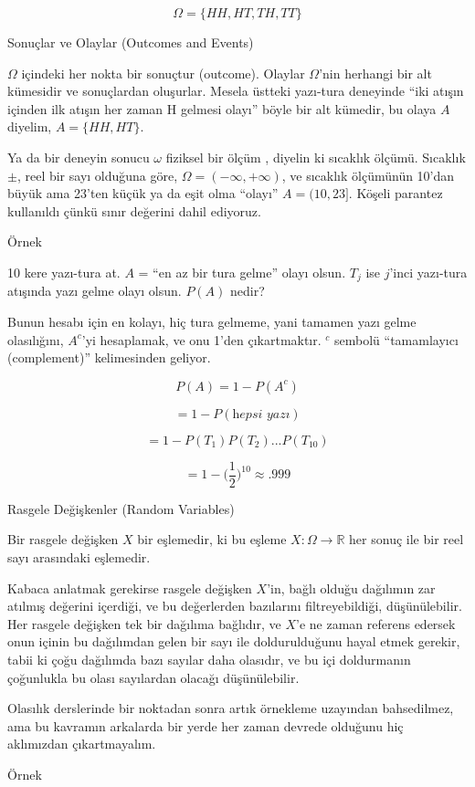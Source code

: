 \documentclass[12pt,fleqn]{article}\usepackage{../../common}
\begin{document}
$$\Omega = \{HH,HT,TH,TT\} $$

Sonuçlar ve Olaylar (Outcomes and Events)

$\Omega$ içindeki her nokta bir sonuçtur (outcome). Olaylar $\Omega$'nin
herhangi bir alt kümesidir ve sonuçlardan oluşurlar. Mesela üstteki
yazı-tura deneyinde ``iki atışın içinden ilk atışın her zaman H gelmesi
olayı'' böyle bir alt kümedir, bu olaya $A$ diyelim, $A =
\{HH,HT\}$.

Ya da bir deneyin sonucu $\omega$ fiziksel bir ölçüm , diyelin ki sıcaklık
ölçümü. Sıcaklık $\pm$, reel bir sayı olduğuna göre, $\Omega = (-\infty,
+\infty)$, ve sıcaklık ölçümünün 10'dan büyük ama 23'ten küçük ya da eşit
olma ``olayı'' $A = (10,23]$. Köşeli parantez kullanıldı çünkü sınır
değerini dahil ediyoruz. 

Örnek 

10 kere yazı-tura at. $A$ = ``en az bir tura gelme'' olayı olsun. $T_j$ ise
$j$'inci yazı-tura atışında yazı gelme olayı olsun. $P(A)$ nedir? 

Bunun hesabı için en kolayı, hiç tura gelmeme, yani tamamen yazı gelme
olasılığını, $A^c$'yi hesaplamak, ve onu 1'den çıkartmaktır. $^c$ sembolü
``tamamlayıcı (complement)'' kelimesinden geliyor.

$$ P(A) = 1 - P(A^c) $$

$$ = 1 - P(\textit{hepsi yazı}) $$

$$ = 1-P(T_1)P(T_2)...P(T_{10}) $$

$$ = 1 - \bigg(\frac{1}{2}\bigg)^{10} \approx .999 $$

Rasgele Değişkenler (Random Variables)

Bir rasgele değişken $X$ bir eşlemedir, ki bu eşleme $X: \Omega \to
\mathbb{R}$ her sonuç ile bir reel sayı arasındaki eşlemedir.

Kabaca anlatmak gerekirse rasgele değişken $X$'in, bağlı olduğu dağılımın
zar atılmış değerini içerdiği, ve bu değerlerden bazılarını
filtreyebildiği, düşünülebilir. Her rasgele değişken tek bir dağılıma
bağlıdır, ve $X$'e ne zaman referens edersek onun içinin bu dağılımdan
gelen bir sayı ile doldurulduğunu hayal etmek gerekir, tabii ki çoğu
dağılımda bazı sayılar daha olasıdır, ve bu içi doldurmanın çoğunlukla bu
olası sayılardan olacağı düşünülebilir.

Olasılık derslerinde bir noktadan sonra artık örnekleme uzayından
bahsedilmez, ama bu kavramın arkalarda bir yerde her zaman devrede olduğunu
hiç aklımızdan çıkartmayalım. 

Örnek
\end{document}
